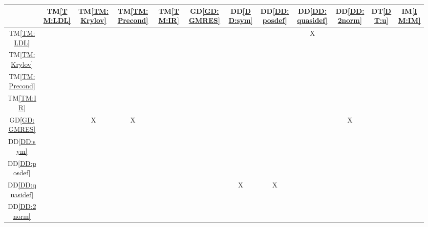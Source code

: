 \documentclass[12pt]{article}
\newcommand{\dref}[1]{GD\ref{#1}}
\newcommand{\ddref}[1]{DD\ref{#1}}
\newcommand{\dtref}[1]{DT\ref{#1}}
\newcommand{\tref}[1]{TM\ref{#1}}
\newcommand{\iref}[1]{IM\ref{#1}}
\begin{document}
\begin{table}[h!]
  \centering
  \begin{tabular}{|c|c|c|c|c|c|c|c|c|c|c|c|} \hline
                        & \tref{TM:LDL} & \tref{TM:Krylov} & \tref{TM:Precond} & \tref{TM:IR} & \dref{GD:GMRES} & \ddref{DD:sym} & \ddref{DD:posdef} & \ddref{DD:quasidef} & \ddref{DD:2norm} & \dtref{DT:u} & \iref{IM:IM} \\ \hline
    \tref{TM:LDL}       &               &                  &                   &              &                 &                &                   & X                   &                  &              &              \\ \hline
    \tref{TM:Krylov}    &               &                  &                   &              &                 &                &                   &                     &                  &              &              \\ \hline
    \tref{TM:Precond}   &               &                  &                   &              &                 &                &                   &                     &                  &              &              \\ \hline
    \tref{TM:IR}        &               &                  &                   &              &                 &                &                   &                     &                  &              &              \\ \hline
    \dref{GD:GMRES}     &               & X                & X                 &              &                 &                &                   &                     & X                &              &              \\ \hline
    \ddref{DD:sym}      &               &                  &                   &              &                 &                &                   &                     &                  &              &              \\ \hline
    \ddref{DD:posdef}   &               &                  &                   &              &                 &                &                   &                     &                  &              &              \\ \hline
    \ddref{DD:quasidef} &               &                  &                   &              &                 & X              & X                 &                     &                  &              &              \\ \hline
    \ddref{DD:2norm}    &               &                  &                   &              &                 &                &                   &                     &                  &              &              \\ \hline

\end{tabular}
\end{table}
\end{document}
